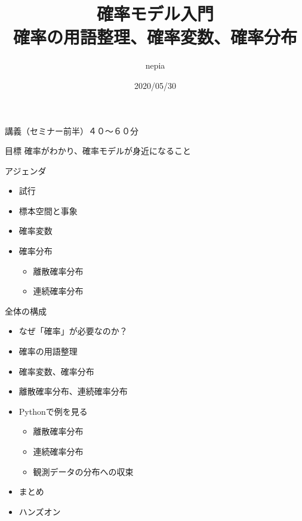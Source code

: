 \documentclass[dvipdfmx,cjk]{beamer}
\title{確率モデル入門\\確率の用語整理、確率変数、確率分布}
\author{nepia}
\date{2020/05/30}
\begin{document}
\begin{frame}
  \titlepage
\end{frame}




\begin{frame}{講義（セミナー前半）４０〜６０分}\pause

\begin{block}{目標}
    確率がわかり、確率モデルが身近になること
\end{block}
\pause

\vskip 1cm

\begin{block}{アジェンダ}
    \begin{itemize}
    \item 試行
    \item 標本空間と事象
    \item 確率変数
    \item 確率分布
        \begin{itemize}
        \item 離散確率分布
        \item 連続確率分布
        \end{itemize}
    \end{itemize}
\end{block}

\end{frame}


\begin{frame}{全体の構成}

\begin{itemize}
    \item なぜ「確率」が必要なのか？
    \item 確率の用語整理
    \item 確率変数、確率分布
    \item 離散確率分布、連続確率分布
    \item Pythonで例を見る
        \begin{itemize}
        \item 離散確率分布
        \item 連続確率分布
        \item 観測データの分布への収束
        \end{itemize}
    \item まとめ
    \item ハンズオン
\end{itemize}

\end{frame}
\end{document}
